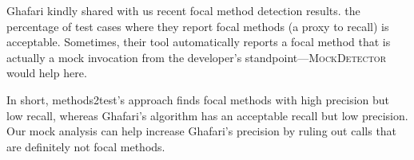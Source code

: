 Ghafari kindly shared with us recent focal method detection results. the percentage of test cases where they report focal methods (a proxy to recall) is acceptable. Sometimes, their tool automatically reports a focal method that is actually a mock invocation from the developer's standpoint---\textsc{MockDetector} would help here. 

In short, methods2test's approach finds focal methods with high precision but low recall, whereas Ghafari's algorithm has an acceptable recall but low precision. Our mock analysis can help increase Ghafari's precision by ruling out calls that are definitely not focal methods.

